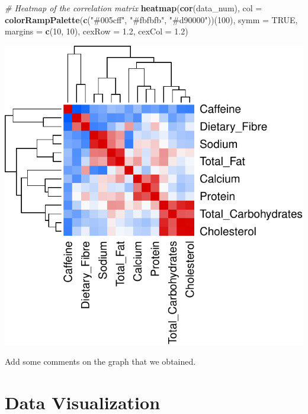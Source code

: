 \documentclass[
]{article}
\newenvironment{Shaded}{\begin{snugshade}}{\end{snugshade}}
\newcommand{\AttributeTok}[1]{\textcolor[rgb]{0.13,0.29,0.53}{#1}}
\newcommand{\CommentTok}[1]{\textcolor[rgb]{0.56,0.35,0.01}{\textit{#1}}}
\newcommand{\ConstantTok}[1]{\textcolor[rgb]{0.56,0.35,0.01}{#1}}
\newcommand{\DecValTok}[1]{\textcolor[rgb]{0.00,0.00,0.81}{#1}}
\newcommand{\FloatTok}[1]{\textcolor[rgb]{0.00,0.00,0.81}{#1}}
\newcommand{\FunctionTok}[1]{\textcolor[rgb]{0.13,0.29,0.53}{\textbf{#1}}}
\newcommand{\NormalTok}[1]{#1}
\newcommand{\StringTok}[1]{\textcolor[rgb]{0.31,0.60,0.02}{#1}}
\begin{document}
\begin{Shaded}
\begin{Highlighting}[]
\CommentTok{\# Heatmap of the correlation matrix}
\FunctionTok{heatmap}\NormalTok{(}\FunctionTok{cor}\NormalTok{(data\_num), }
        \AttributeTok{col =} \FunctionTok{colorRampPalette}\NormalTok{(}\FunctionTok{c}\NormalTok{(}\StringTok{"\#005cff"}\NormalTok{, }\StringTok{"\#fbfbfb"}\NormalTok{, }\StringTok{"\#d90000"}\NormalTok{))(}\DecValTok{100}\NormalTok{), }
        \AttributeTok{symm =} \ConstantTok{TRUE}\NormalTok{, }
        \AttributeTok{margins =} \FunctionTok{c}\NormalTok{(}\DecValTok{10}\NormalTok{, }\DecValTok{10}\NormalTok{), }
        \AttributeTok{cexRow =} \FloatTok{1.2}\NormalTok{,}
        \AttributeTok{cexCol =} \FloatTok{1.2}\NormalTok{)}
\end{Highlighting}
\end{Shaded}

\begin{center}\includegraphics{Statistical_Learning_Final_Report_files/figure-latex/correlation_analysis-2} \end{center}

Add some comments on the graph that we obtained.

\section{Data Visualization}\label{data-visualization}
\end{document}
